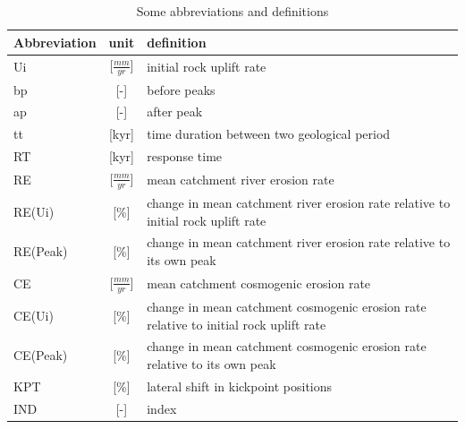 \documentclass[11pt,a4paper,titlepage]{report}
\begin{document}

\begin{table}[H]
\centering
\caption{Some abbreviations and definitions}
\begin{tabular}{l|c|l}
Abbreviation & unit & definition\\
\hline
Ui & [$\frac{mm}{yr}$] & initial rock uplift rate\\
bp & [-] & before peaks\\
ap & [-] & after peak\\
tt & [kyr] & time duration between two geological period\\
RT & [kyr] & response time\\
RE & [$\frac{mm}{yr}$] & mean catchment river erosion rate\\
RE(Ui) & [\%] & change in mean catchment river erosion rate relative to initial rock uplift rate\\
RE(Peak) & [\%] & change in mean catchment river erosion rate relative to its own peak\\
CE & [$\frac{mm}{yr}$] & mean catchment cosmogenic erosion rate\\
CE(Ui) & [\%] & change in mean catchment cosmogenic erosion rate relative to initial rock uplift rate\\
CE(Peak) & [\%] & change in mean catchment cosmogenic erosion rate relative to its own peak\\
KPT & [\%] & lateral shift in kickpoint positions\\
IND & [-] & index\\

\end{tabular}\\
\label{tab:abbr} 
\end{table}
\end{document}
